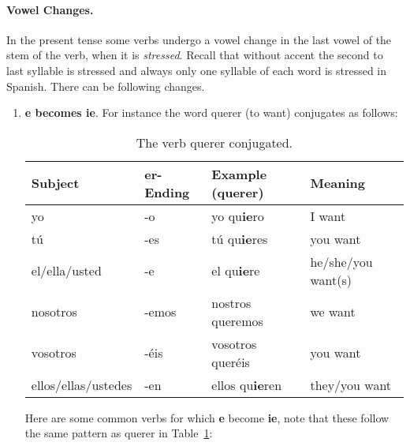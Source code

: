 \documentclass[a4paper,12pt]{article}
\newcommand*{\Verb}[2]{\index[Verbs]{\makebox[0.5\textwidth][l]{#1} #2 \hfill cf.}}
\begin{document}
\paragraph{Vowel Changes. } In the present tense some verbs undergo a vowel change in the last vowel
of the stem of the verb, when it is \emph{stressed}. Recall that without accent the second to last
syllable is stressed and always only one syllable of each word is stressed in Spanish. There can be
following changes.

\begin{enumerate}
\item \textbf{e becomes ie}. For instance the word \textsf{querer} (to want) conjugates as follows:

  \begin{table}[H]
    \centering
    \begin{tabular}{llll}
      Subject             & er-Ending & Example (querer)       & Meaning            \\
      \toprule
      yo                  & -o        & yo qu\textbf{ie}ro     & I want             \\
      tú                  & -es       & tú qu\textbf{ie}res    & you want           \\
      el/ella/usted       & -e        & el qu\textbf{ie}re     & he/she/you want(s) \\
      nosotros            & -emos     & nostros queremos       & we want            \\
      vosotros            & -éis       & vosotros queréis       & you want           \\
      ellos/ellas/ustedes & -en       & ellos qu\textbf{ie}ren & they/you want      \\
      \bottomrule
    \end{tabular}
    \caption{\label{tbl:querer} The verb querer conjugated.\Verb{querer}{to want}}
  \end{table}

  Here are some common verbs for which \textbf{e} become \textbf{ie}, note that these follow the
  same pattern as querer in Table~\ref{tbl:querer}:


\end{enumerate}
\end{document}
